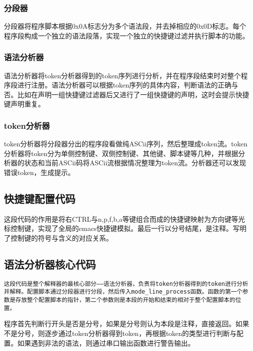 \subsubsection{  分段器}

分段器将程序脚本根据0x0A标志分为多个语法段，并去掉相应的0x0D标志。每个程序段构成一个独立的语法段落，实现一个独立的快捷键过滤并执行脚本的功能。

\subsubsection{ 语法分析器}

语法分析器将token分析器得到的token序列进行分析，并在程序段结束时对整个程序段进行注册。语法分析器可以根据token序列的具体内容，判断语法的正确与否。比如在声明一组快捷键过滤器后又进行了一组快捷键的声明，这时会提示快捷键声明重复。

\subsubsection{  token分析器}

token分析器将分段器分出的程序段看做纯ASCii序列，然后整理成token流。token分析器将token分为单侧控制键、双侧控制键、其他键、脚本键等几种，并根据分析器的状态和当前ASCii码将ASCii流根据情况整理为token流。分析器还可以发现错误token，生成提示。


\subsection{快捷键配置代码}
这段代码的作用是将右CTRL与n,p,f,b,a等键组合而成的快捷键映射为方向键等光标控制键，实现了全局的emacs快捷键模拟。最后一行以分号结尾，是注释。写明了控制键的符号与含义的对应关系。


\subsection{语法分析器核心代码}
\verb|这段代码是整个解释器的最核心部分——语法分析器，负责将token分析器得到的token进行分析并解释。配置脚本通过分段器进行分段，然后传入mode_line_process函数。函数的第一个参数是存放整个配置脚本的指针，第二个参数则是本段的开始和结束的相对于整个配置脚本的位置。|

程序首先判断行开头是否是分号，如果是分号则认为本段是注释，直接返回。如果不是分号，则逐步通过token分析器得到token，再根据token的类型进行判断与配置。如果遇到非法的语法，则通过串口输出函数进行警告输出。



